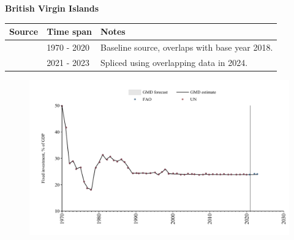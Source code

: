 \documentclass[12pt,a4paper,landscape]{article}
\begin{document}
\begin{adjustbox}{max totalsize={\paperwidth}{\paperheight},center}
\begin{minipage}[t][\textheight][t]{\textwidth}
\vspace*{0.5cm}
{}
\begin{center}
{\Large\bfseries British Virgin Islands}
\end{center}
\vspace{0.5cm}
\begin{table}[H]
\centering
\small
\begin{tabular}{|l|l|l|}
\hline
\textbf{Source} & \textbf{Time span} & \textbf{Notes} \\
\hline
\rowcolor{white}\cite{UN}& 1970 - 2020 &Baseline source, overlaps with base year 2018.\\
\rowcolor{lightgray}\cite{FAO}& 2021 - 2023 &Spliced using overlapping data in 2024.\\
\hline
\end{tabular}
\end{table}
\begin{figure}[H]
\centering
\includegraphics[width=\textwidth,height=0.6\textheight,keepaspectratio]{graphs/VGB_finv_GDP.pdf}
\end{figure}
\end{minipage}
\end{adjustbox}
\end{document}
